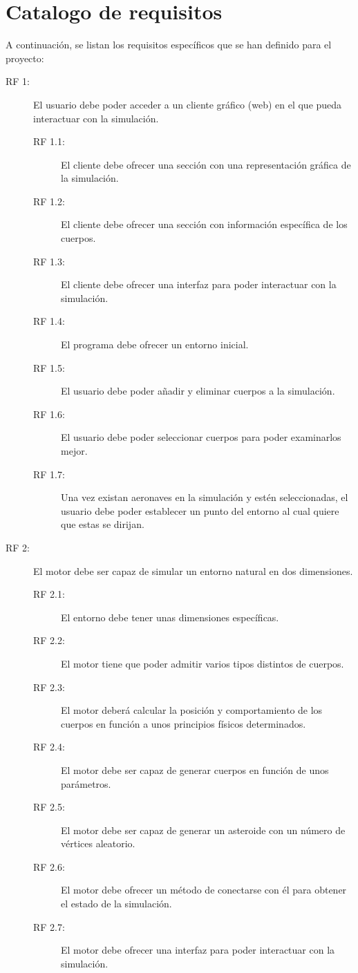 \section{Catalogo de requisitos}
A continuación, se listan los requisitos específicos que se han definido para el proyecto:
\begin{description}
    \item[RF 1:] El usuario debe poder acceder a un cliente gráfico (web) en el que pueda interactuar con la simulación.
    \begin{description}
        \item[RF 1.1:] El cliente debe ofrecer una sección con una representación gráfica de la simulación.
        \item[RF 1.2:] El cliente debe ofrecer una sección con información específica de los cuerpos.
        \item[RF 1.3:] El cliente debe ofrecer una interfaz para poder interactuar con la simulación.
        \item[RF 1.4:] El programa debe ofrecer un entorno inicial.
        \item[RF 1.5:] El usuario debe poder añadir y eliminar cuerpos a la simulación.
        \item[RF 1.6:] El usuario debe poder seleccionar cuerpos para poder examinarlos mejor.
        \item[RF 1.7:] Una vez existan aeronaves en la simulación y estén seleccionadas, el usuario debe poder establecer un punto del entorno al cual quiere que estas se dirijan.
    \end{description}
    \item[RF 2:] El motor debe ser capaz de simular un entorno natural en dos dimensiones.
    \begin{description}
        \item[RF 2.1:] El entorno debe tener unas dimensiones específicas.
        \item[RF 2.2:] El motor tiene que poder admitir varios tipos distintos de cuerpos.
        \item[RF 2.3:] El motor deberá calcular la posición y comportamiento de los cuerpos en función a unos principios físicos determinados.
        \item[RF 2.4:] El motor debe ser capaz de generar cuerpos en función de unos parámetros.
        \item[RF 2.5:] El motor debe ser capaz de generar un asteroide con un número de vértices aleatorio.
        \item[RF 2.6:] El motor debe ofrecer un método de conectarse con él para obtener el estado de la simulación.
        \item[RF 2.7:] El motor debe ofrecer una interfaz para poder interactuar con la simulación.
    \end{description}
\end{description}

